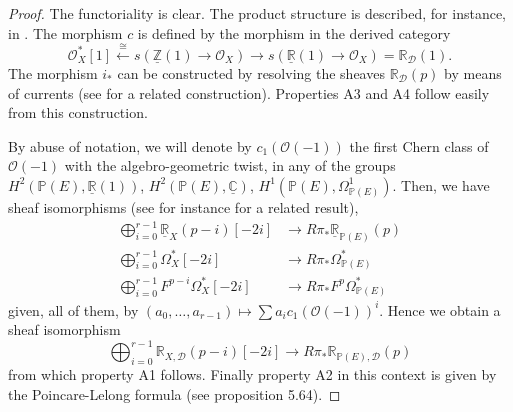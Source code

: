 \documentclass[10pt,twoside]{article}
\numberwithin{equation}{section}
\theoremstyle{plain}
\theoremstyle{definition}
\begin{document}
\begin{proof}
  The functoriality is clear. The product structure is described, for
  instance, in \cite{EsnaultViehweg:DBc}. The morphism $c$ is defined
  by the morphism in the derived category
  \begin{displaymath}
    \mathcal{O}^{\ast}_{X}[1]\overset{\cong}{\longleftarrow}
    s(\underline {\mathbb{Z}}(1)\rightarrow \mathcal{O}_{X})
    \longrightarrow s(\underline {\mathbb{R}}(1)\rightarrow
    \mathcal{O}_{X}) = \mathbb{R}_{\mathcal{D}}(1).
  \end{displaymath}
  The morphism $i_{\ast}$ can be constructed by resolving the sheaves
  $\mathbb{R}_{\mathcal{D}}(p)$ by means of currents (see
  \cite{Jannsen:DcHD} for a related construction). Properties 
  A3 and A4 follow easily from this
  construction. 

  By abuse of
  notation, we will denote by $c_{1}(\mathcal{O}(-1))$ the first Chern
  class of $\mathcal{O}(-1)$ with the algebro-geometric twist, in any
  of the groups 
  $H^{2}(\mathbb{P}(E),\underline {\mathbb{R}}(1))$,
  $H^{2}(\mathbb{P}(E),\underline {\mathbb{C}})$,
  $H^{1}(\mathbb{P}(E),\Omega ^{1}_{\mathbb{P}(E)})$. Then, we have
  sheaf isomorphisms (see for instance \cite{Gros:MR844488} for a related
  result),
  \begin{align*}
    \bigoplus_{i=0}^{r-1}\underline {\mathbb{R}}_{X}(p-i)[-2i]
    &
    \longrightarrow R\pi _{\ast}\underline {\mathbb{R}}_{\mathbb{P}(E)}(p)\\
    \bigoplus_{i=0}^{r-1}\Omega ^{\ast}_{X}[-2i]
    &
    \longrightarrow R\pi _{\ast}\Omega ^{\ast}_{\mathbb{P}(E)}\\
    \bigoplus_{i=0}^{r-1}F^{p-i}\Omega ^{\ast}_{X}[-2i]
    &
    \longrightarrow R\pi _{\ast}F^{p}\Omega ^{\ast}_{\mathbb{P}(E)}
  \end{align*}
  given, all of them, by $(a_{0},\dots ,a_{r-1})\longmapsto \sum
  a_{i}c_{1}(\mathcal{O}(-1))^{i}$.  
  Hence we obtain a sheaf isomorphism
  \begin{displaymath}
        \bigoplus_{i=0}^{r-1}\mathbb{R}_{X,\mathcal{D}}(p-i)[-2i]
    \longrightarrow R\pi _{\ast}\mathbb{R}_{\mathbb{P}(E),\mathcal{D}}(p)
  \end{displaymath}
  from which property A1 follows. Finally property
  A2 in this context is given by the Poincare-Lelong
  formula (see \cite{BurgosKramerKuehn:cacg} proposition 5.64). 
\end{proof}
\end{document}
